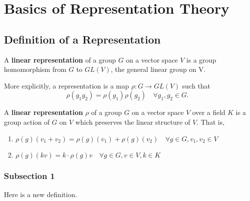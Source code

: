 
\chapter{Basics of Representation Theory} %




\section{Definition of a Representation}

\begin{defn}A \textbf{linear representation} of a group $G$ on a vector space $V$  is a group homomorphism from $G$ to $GL(V)$, the general linear group on V. \end{defn}
 More explicitly, a representation is a map $\rho : G \rightarrow GL(V)$ such that \[ \rho (g_1 g_2) = \rho(g_1) \rho(g_2) \quad \forall g_1, g_2 \in G. \]

\begin{defn}A \textbf{linear representation} $\rho$ of a group $G$ on a vector space $V$ over a field $K$ is a group action of $G$ on $V$ which preserves the linear structure of $V$.  That is, 
\begin{enumerate}
\item  $\rho(g)(v_1+v_2)=\rho(g)(v_1)+\rho(g)(v_2) \quad  \forall g \in G, v_1, v_2 \in V$
\item $\rho(g)(kv) = k \cdot \rho(g)v \quad \forall g \in G, v \in V, k \in K$
\end{enumerate}

 \end{defn}


\subsection{Subsection 1}

\begin{defn}Here is a new definition.\end{defn}

